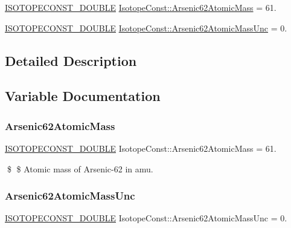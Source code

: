 \begin{DoxyCompactItemize}
\item 
\mbox{\hyperlink{group___isotope_const-_macros_ga8f45a7272ce02c0b4c65c44636ed719a}{I\+S\+O\+T\+O\+P\+E\+C\+O\+N\+S\+T\+\_\+\+D\+O\+U\+B\+LE}} \mbox{\hyperlink{group___isotope_const-_arsenic-_as62_ga1c47fdbad3478cd35326652901b18d5b}{Isotope\+Const\+::\+Arsenic62\+Atomic\+Mass}} = 61.
\item 
\mbox{\hyperlink{group___isotope_const-_macros_ga8f45a7272ce02c0b4c65c44636ed719a}{I\+S\+O\+T\+O\+P\+E\+C\+O\+N\+S\+T\+\_\+\+D\+O\+U\+B\+LE}} \mbox{\hyperlink{group___isotope_const-_arsenic-_as62_ga8ec021732286acf0c1a59c5d39856943}{Isotope\+Const\+::\+Arsenic62\+Atomic\+Mass\+Unc}} = 0.
\end{DoxyCompactItemize}


\subsection{Detailed Description}


\subsection{Variable Documentation}
\mbox{\label{group___isotope_const-_arsenic-_as62_ga1c47fdbad3478cd35326652901b18d5b}} 
\subsubsection{\texorpdfstring{Arsenic62\+Atomic\+Mass}{Arsenic62AtomicMass}}
{\footnotesize\ttfamily \mbox{\hyperlink{group___isotope_const-_macros_ga8f45a7272ce02c0b4c65c44636ed719a}{I\+S\+O\+T\+O\+P\+E\+C\+O\+N\+S\+T\+\_\+\+D\+O\+U\+B\+LE}} Isotope\+Const\+::\+Arsenic62\+Atomic\+Mass = 61.}

\$ \$ Atomic mass of Arsenic-\/62 in amu. \mbox{\label{group___isotope_const-_arsenic-_as62_ga8ec021732286acf0c1a59c5d39856943}} 
\subsubsection{\texorpdfstring{Arsenic62\+Atomic\+Mass\+Unc}{Arsenic62AtomicMassUnc}}
{\footnotesize\ttfamily \mbox{\hyperlink{group___isotope_const-_macros_ga8f45a7272ce02c0b4c65c44636ed719a}{I\+S\+O\+T\+O\+P\+E\+C\+O\+N\+S\+T\+\_\+\+D\+O\+U\+B\+LE}} Isotope\+Const\+::\+Arsenic62\+Atomic\+Mass\+Unc = 0.}

